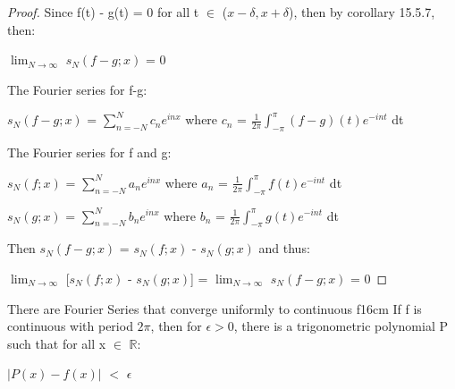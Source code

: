     \begin{proof}
        Since f(t) - g(t) = 0 for all t $\in$ ($x-\delta,x+\delta$),
        then by {\color{orange} corollary 15.5.7}, then:

        \hspace{0.5cm}
        $\lim_{N \rightarrow \infty}$ $s_N(f-g;x)$ = 0

        The Fourier series for f-g:

        \hspace{0.5cm}
        $s_N(f-g;x)$ = $\sum_{n=-N}^N c_ne^{inx}$
        \hspace{1cm}
        where $c_n$ = $\frac{1}{2\pi} \int_{-\pi}^{\pi} (f-g)(t)e^{-int}$ dt

        The Fourier series for f and g:

        \hspace{0.5cm}
        $s_N(f;x)$ = $\sum_{n=-N}^N a_ne^{inx}$
        \hspace{1cm}
        where $a_n$ = $\frac{1}{2\pi} \int_{-\pi}^{\pi} f(t)e^{-int}$ dt

        \hspace{0.5cm}
        $s_N(g;x)$ = $\sum_{n=-N}^N b_ne^{inx}$
        \hspace{1cm}
        where $b_n$ = $\frac{1}{2\pi} \int_{-\pi}^{\pi} g(t)e^{-int}$ dt

        Then $s_N(f-g;x)$ = $s_N(f;x)$ - $s_N(g;x)$ and thus:

        \hspace{0.5cm}
        $\lim_{N \rightarrow \infty}$ [$s_N(f;x)$ - $s_N(g;x)$]
        = $\lim_{N \rightarrow \infty}$ $s_N(f-g;x)$ = 0
    \end{proof}

    \vspace{0.5cm}



    \begin{wtheorem}{There are Fourier Series that converge uniformly
    to continuous f}{16cm}
        If f is continuous with period $2\pi$, then for $\epsilon > 0$,
        there is a trigonometric polynomial P such that
        for all x $\in$ $\mathbb{R}$:

        \hspace{0.5cm}
        $|P(x) - f(x)|$ $<$ $\epsilon$
    \end{wtheorem}

